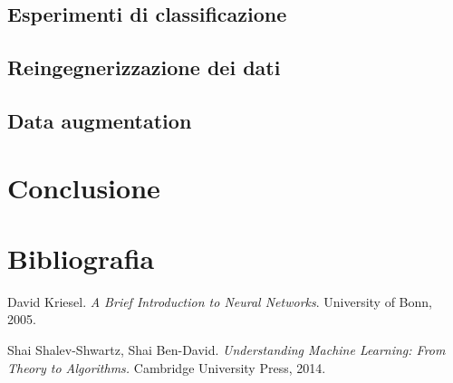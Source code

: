 \documentclass[12pt, twoside, letterpaper]{report}
\begin{document}
		\section{Esperimenti di classificazione}
		\section{Reingegnerizzazione dei dati}
		\section{Data augmentation}

	\chapter*{Conclusione}	
	\chapter*{Bibliografia}
		\begin{enumerate}[label={[\arabic*]}]
			\item David Kriesel. \textit{A Brief Introduction to Neural Networks}. University of Bonn, 2005.
			\item Shai Shalev-Shwartz, Shai Ben-David. \textit{Understanding Machine Learning: From Theory to Algorithms.} Cambridge University Press, 2014.
		\end{enumerate}
	
\end{document}

